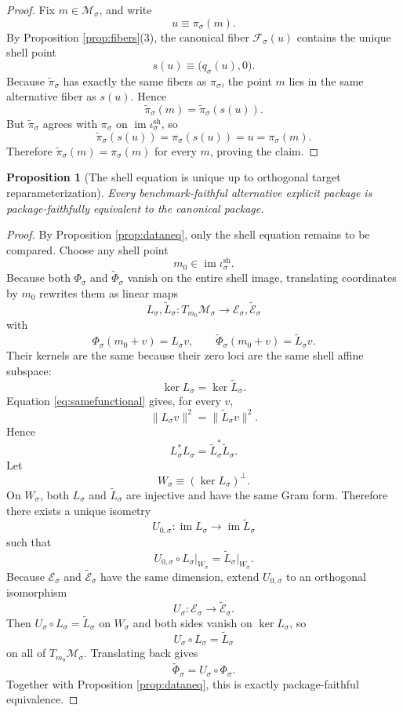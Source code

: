 \documentclass[11pt]{article}
\newcommand{\SubSpace}[1]{\mathcal M_{#1}}
\newcommand{\DataProj}[1]{\pi_{#1}}
\newcommand{\SubTarget}[1]{\mathcal E_{#1}}
\newcommand{\ShellEquation}[1]{\Phi_{#1}}
\newcommand{\Fiber}[1]{\mathcal F_{#1}}
\newcommand{\ShellEmbed}[1]{\iota_{#1}^{\mathrm{sh}}}
\newcommand{\AltDataProj}[1]{\widetilde\pi_{#1}}
\newcommand{\AltShellEquation}[1]{\widetilde\Phi_{#1}}
\newcommand{\AltTarget}[1]{\widetilde{\mathcal E}_{#1}}
\newtheorem{proposition}{Proposition}
\begin{document}
\begin{proof}
Fix \(m\in\SubSpace{\sigma}\), and write
\[
u\equiv \DataProj{\sigma}(m).
\]
By Proposition \ref{prop:fibers}(3), the canonical fiber \(\Fiber{\sigma}(u)\) contains the unique shell point
\[
s(u)\equiv \bigl(q_{\sigma}(u),0\bigr).
\]
Because \(\AltDataProj{\sigma}\) has exactly the same fibers as \(\DataProj{\sigma}\), the point \(m\) lies in the same alternative fiber as \(s(u)\). Hence
\[
\AltDataProj{\sigma}(m)=\AltDataProj{\sigma}(s(u)).
\]
But \(\AltDataProj{\sigma}\) agrees with \(\DataProj{\sigma}\) on \(\operatorname{im}\ShellEmbed{\sigma}\), so
\[
\AltDataProj{\sigma}(s(u))
=
\DataProj{\sigma}(s(u))
=
u
=
\DataProj{\sigma}(m).
\]
Therefore \(\AltDataProj{\sigma}(m)=\DataProj{\sigma}(m)\) for every \(m\), proving the claim.
\end{proof}

\begin{proposition}[The shell equation is unique up to orthogonal target reparameterization]
\label{prop:phiequiv}
Every benchmark-faithful alternative explicit package is package-faithfully equivalent to the canonical package.
\end{proposition}

\begin{proof}
By Proposition \ref{prop:dataneq}, only the shell equation remains to be compared. Choose any shell point
\[
m_{0}\in \operatorname{im}\ShellEmbed{\sigma}.
\]
Because both \(\ShellEquation{\sigma}\) and \(\AltShellEquation{\sigma}\) vanish on the entire shell image, translating coordinates by \(m_{0}\) rewrites them as linear maps
\[
L_{\sigma},\widetilde L_{\sigma}:T_{m_{0}}\SubSpace{\sigma}\to
\SubTarget{\sigma},\AltTarget{\sigma}
\]
with
\[
\ShellEquation{\sigma}(m_{0}+v)=L_{\sigma}v,
\qquad
\AltShellEquation{\sigma}(m_{0}+v)=\widetilde L_{\sigma}v.
\]
Their kernels are the same because their zero loci are the same shell affine subspace:
\[
\ker L_{\sigma}=\ker \widetilde L_{\sigma}.
\]
Equation \eqref{eq:samefunctional} gives, for every \(v\),
\[
\|L_{\sigma}v\|^{2}
=
\|\widetilde L_{\sigma}v\|^{2}.
\]
Hence
\[
L_{\sigma}^{*}L_{\sigma}
=
\widetilde L_{\sigma}^{*}\widetilde L_{\sigma}.
\]
Let
\[
W_{\sigma}\equiv (\ker L_{\sigma})^{\perp}.
\]
On \(W_{\sigma}\), both \(L_{\sigma}\) and \(\widetilde L_{\sigma}\) are injective and have the same Gram form. Therefore there exists a unique isometry
\[
U_{0,\sigma}:\operatorname{im}L_{\sigma}\to\operatorname{im}\widetilde L_{\sigma}
\]
such that
\[
U_{0,\sigma}\circ L_{\sigma}\big|_{W_{\sigma}}
=
\widetilde L_{\sigma}\big|_{W_{\sigma}}.
\]
Because \(\SubTarget{\sigma}\) and \(\AltTarget{\sigma}\) have the same dimension, extend \(U_{0,\sigma}\) to an orthogonal isomorphism
\[
U_{\sigma}:\SubTarget{\sigma}\to \AltTarget{\sigma}.
\]
Then \(U_{\sigma}\circ L_{\sigma}=\widetilde L_{\sigma}\) on \(W_{\sigma}\) and both sides vanish on \(\ker L_{\sigma}\), so
\[
U_{\sigma}\circ L_{\sigma}=\widetilde L_{\sigma}
\]
on all of \(T_{m_{0}}\SubSpace{\sigma}\). Translating back gives
\[
\AltShellEquation{\sigma}=U_{\sigma}\circ\ShellEquation{\sigma}.
\]
Together with Proposition \ref{prop:dataneq}, this is exactly package-faithful equivalence.
\end{proof}
\end{document}
